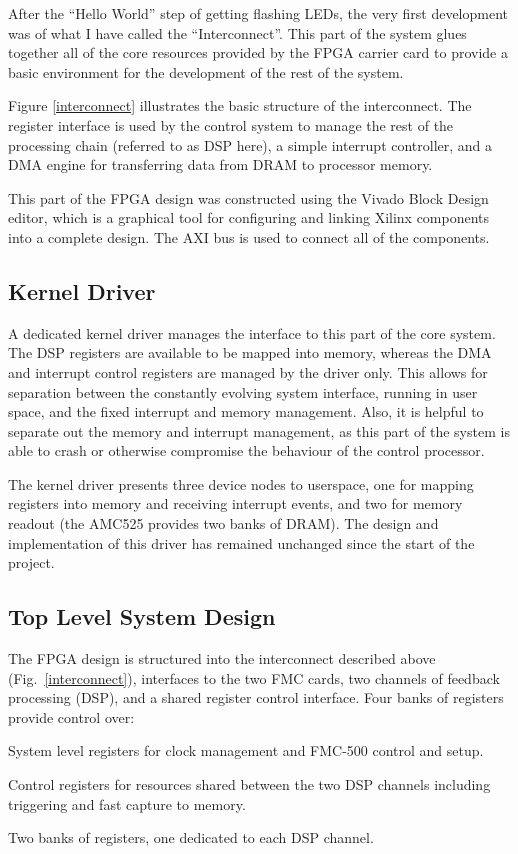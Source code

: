 \documentclass[
    a4paper,
    keeplastbox,            %
    hyphens,                %
    nospread,               %
]{jacow}
\begin{document}
After the ``Hello World'' step of getting flashing LEDs, the very first
development was of what I have called the ``Interconnect''.  This part of the
system glues together all of the core resources provided by the FPGA carrier
card to provide a basic environment for the development of the rest of the
system.

Figure \ref{interconnect} illustrates the basic structure of the interconnect.
The register interface is used by the control system to manage the rest of the
processing chain (referred to as DSP here), a simple interrupt controller, and a
DMA engine for transferring data from DRAM to processor memory.

This part of the FPGA design was constructed using the Vivado Block Design
editor, which is a graphical tool for configuring and linking Xilinx components
into a complete design.  The AXI bus is used to connect all of the components.


\subsection{Kernel Driver}

A dedicated kernel driver manages the interface to this part of the core system.
The DSP registers are available to be mapped into memory, whereas the DMA and
interrupt control registers are managed by the driver only.  This allows for
separation between the constantly evolving system interface, running in user
space, and the fixed interrupt and memory management.  Also, it is helpful to
separate out the memory and interrupt management, as this part of the system is
able to crash or otherwise compromise the behaviour of the control processor.

The kernel driver presents three device nodes to userspace, one for mapping
registers into memory and receiving interrupt events, and two for memory readout
(the AMC525 provides two banks of DRAM).  The design and implementation of this
driver has remained unchanged since the start of the project.


\subsection{Top Level System Design}

The FPGA design is structured into the interconnect described above
(Fig.~\ref{interconnect}), interfaces to the two FMC cards, two channels of
feedback processing (DSP), and a shared register control interface.  Four banks
of registers provide control over:
\begin{Itemize}
\item
    System level registers for clock management and FMC-500 control and setup.
\item
    Control registers for resources shared between the two DSP channels
    including triggering and fast capture to memory.
\item
    Two banks of registers, one dedicated to each DSP channel.
\end{Itemize}
\end{document}
